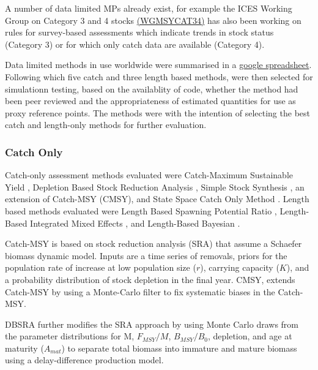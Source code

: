A number of data limited MPs already exist, for example the ICES Working Group on Category 3 and 4 stocks \href{ 
http://www.ices.dk/sites/pub/Publication Reports/Expert Group Report/acom/2017/WKMSYCAT34/01 WKMSYCAT34 REPORT 2017.pdf}{(WGMSYCAT34)} has also been working on rules for survey-based assessments which indicate trends in stock status (Category 3) or for which only catch data are available (Category 4). 

Data limited methods in use worldwide were summarised in a \href{https://docs.google.com/spreadsheets/d/17_qQdzDY41ZrL0yT6QtHpUR4_ydxx_xfCh4GiDqYymU/edit?usp=sharing}{google spreadsheet}. Following which five catch and three length based methods, were then selected for simulationn testing, based on the availablity of code, whether the method had been peer reviewed and the appropriateness of estimated quantities for use as proxy reference points. The methods were  \citep{pons2019catchlen} with the intention of selecting the best catch and length-only methods for further evaluation.


\subsubsection*{Catch Only}

Catch-only assessment methods evaluated were Catch-Maximum Sustainable Yield \citep[Catch-MSY][]{martell2013simple}, Depletion Based  Stock Reduction Analysis \citep[DBSRA][]{dick2011depletion}, Simple Stock Synthesis \citep[SSS][]{cope2013implementing}, an extension of Catch-MSY (CMSY), and State Space Catch Only Method \citep[SSCOM][]{thorson2015catch}. Length based methods evaluated were Length Based Spawning Potential Ratio \citep[LBSPR][]{hordyk2014novel,hordyk2015evaluation}, Length-Based Integrated Mixed Effects \citep[LIME][]{rudd2017accounting}, and Length-Based Bayesian \citep[LBB][]{froese2018new}.

Catch-MSY  is based on stock reduction analysis (SRA) that assume a Schaefer biomass dynamic model. Inputs are a time series of removals, priors for the population rate of increase at low population size ($r$), carrying capacity ($K$), and a probability distribution of stock depletion in the final year. CMSY, extends Catch-MSY by using a Monte-Carlo filter to fix systematic biases in the Catch-MSY. 

DBSRA further modifies the SRA approach by using Monte Carlo draws from the parameter distributions for M, $F_{MSY}/M$, $B_{MSY}/B_0$, depletion, and age at maturity ($A_{mat}$) to separate total biomass into immature and mature biomass using a delay-difference production model. 

